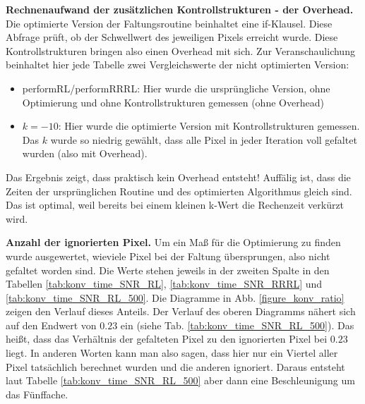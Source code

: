 \documentclass[a4paper,12pt]{article}
\begin{document}
\textbf{Rechnenaufwand der zusätzlichen Kontrollstrukturen - der Overhead.}
Die optimierte Version der Faltungsroutine beinhaltet eine if-Klausel. Diese
Abfrage prüft, ob der Schwellwert des jeweiligen Pixels erreicht wurde. 
Diese Kontrollstrukturen bringen also einen Overhead mit sich. Zur
Veranschaulichung beinhaltet hier jede Tabelle zwei Vergleichswerte der
nicht optimierten Version:
\begin{itemize}
  \itemsep -1pt
  \item performRL/performRRRL: Hier wurde die ursprüngliche Version, ohne
  Optimierung und ohne Kontrollstrukturen gemessen (ohne Overhead)
  \item $k=-10$: Hier wurde die optimierte Version mit Kontrollstrukturen
  gemessen. Das $k$ wurde so niedrig gewählt, dass alle Pixel in jeder Iteration
  voll gefaltet wurden (also mit Overhead).
\end{itemize}
Das Ergebnis zeigt, dass praktisch kein Overhead entsteht! Auffälig ist, dass
die Zeiten der ursprünglichen Routine und des optimierten Algorithmus gleich
sind. Das ist optimal, weil bereits bei einem kleinen k-Wert die Rechenzeit
verkürzt wird.

\textbf{Anzahl der ignorierten Pixel.} Um ein Maß für die Optimierung zu finden
wurde ausgewertet, wieviele Pixel bei der Faltung übersprungen, also nicht
gefaltet worden sind. Die Werte stehen jeweils in der zweiten Spalte in den
Tabellen \ref{tab:konv_time_SNR_RL}, \ref{tab:konv_time_SNR_RRRL} und
\ref{tab:konv_time_SNR_RL_500}. Die Diagramme in Abb. \ref{figure_konv_ratio}
zeigen den Verlauf dieses Anteils. Der Verlauf des oberen Diagramms nähert sich
auf den Endwert von $0.23$ ein (siehe Tab. \ref{tab:konv_time_SNR_RL_500}). Das
heißt, dass das Verhältnis der gefalteten Pixel zu den ignorierten Pixel bei
$0.23$ liegt. In anderen Worten kann man also sagen, dass hier nur ein
Viertel aller Pixel tatsächlich berechnet wurden und die anderen ignoriert. Daraus
entsteht laut Tabelle \ref{tab:konv_time_SNR_RL_500} aber dann eine
Beschleunigung um das Fünffache.
\end{document}
